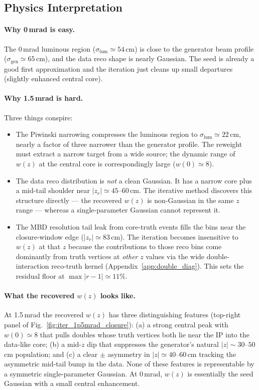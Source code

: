 \documentclass[11pt,a4paper]{article}
\begin{document}
\subsection{Physics Interpretation}
\label{subsec:iter_interp}

\paragraph{Why 0\,mrad is easy.}
The 0\,mrad luminous region ($\sigma_\mathrm{lum}\simeq 54$\,cm)
is close to the generator beam profile ($\sigma_\mathrm{gen}\simeq 65$\,cm),
and the data reco shape is nearly Gaussian. The seed is already a
good first approximation and the iteration just cleans up small
departures (slightly enhanced central core).

\paragraph{Why 1.5\,mrad is hard.}
Three things conspire:
\begin{itemize}
\item The Piwinski narrowing compresses the luminous region to
  $\sigma_\mathrm{lum}\simeq 22$\,cm, nearly a factor of three
  narrower than the generator profile. The reweight must extract
  a narrow target from a wide source; the dynamic range of $w(z)$
  at the central core is correspondingly large ($w(0)\simeq 8$).
\item The data reco distribution is \emph{not} a clean Gaussian.
  It has a narrow core plus a mid-tail shoulder near
  $|z_r|\simeq 45$--$60$\,cm. The iterative method discovers this
  structure directly --- the recovered $w(z)$ is non-Gaussian in
  the same $z$ range --- whereas a single-parameter Gaussian
  cannot represent it.
\item The MBD resolution tail leak from core-truth events fills
  the bins near the closure-window edge ($|z_r|\simeq 83$\,cm).
  The iteration becomes insensitive to $w(z)$ at that $z$ because
  the contributions to those reco bins come dominantly from truth
  vertices at \emph{other} $z$ values via the wide
  double-interaction reco-truth kernel
  (Appendix~\ref{app:double_diag}). This sets the residual floor
  at $\max|r-1|\simeq 11\%$.
\end{itemize}

\paragraph{What the recovered $w(z)$ looks like.}
At 1.5\,mrad the recovered $w(z)$ has three distinguishing
features (top-right panel of Fig.~\ref{fig:iter_1p5mrad_closure}):
(a) a strong central peak with $w(0)\simeq 8$ that pulls doubles
whose truth vertices both lie near the IP into the data-like core;
(b) a mid-$z$ dip that suppresses the generator's natural
$|z|\sim 30$--$50$\,cm population; and (c) a clear $\pm$ asymmetry
in $|z|\simeq 40$--$60$\,cm tracking the asymmetric mid-tail bump
in the data. None of these features is representable by a
symmetric single-parameter Gaussian. At 0\,mrad, $w(z)$ is
essentially the seed Gaussian with a small central enhancement.
\end{document}
